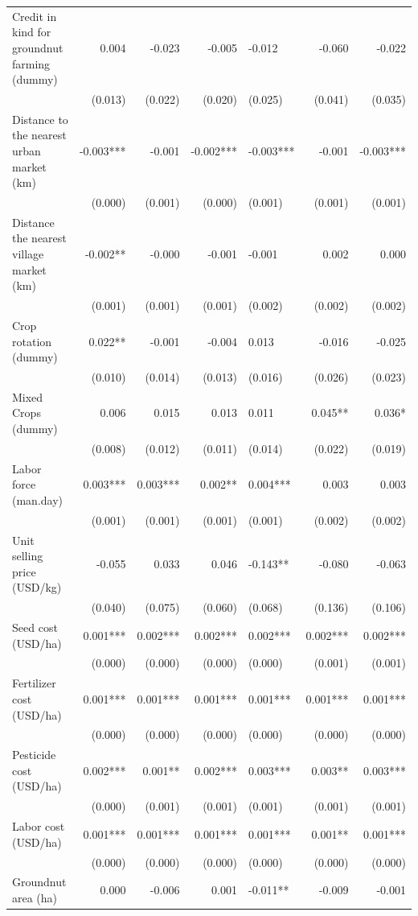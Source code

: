 \documentclass[
]{article}
\begin{document}
\begin{landscape}
\begin{longtable}[t]{lrrrlrr}
Credit in kind for groundnut farming (dummy) & 0.004 & -0.023 & -0.005 & -0.012 & -0.060 & -0.022\\
 & (0.013) & (0.022) & (0.020) & (0.025) & (0.041) & (0.035)\\
Distance to the nearest urban market (km) & -0.003*** & -0.001 & -0.002*** & -0.003*** & -0.001 & -0.003***\\
 & (0.000) & (0.001) & (0.000) & (0.001) & (0.001) & (0.001)\\
Distance the nearest village market (km) & -0.002** & -0.000 & -0.001 & -0.001 & 0.002 & 0.000\\
 & (0.001) & (0.001) & (0.001) & (0.002) & (0.002) & (0.002)\\
Crop rotation (dummy) & 0.022** & -0.001 & -0.004 & 0.013 & -0.016 & -0.025\\
 & (0.010) & (0.014) & (0.013) & (0.016) & (0.026) & (0.023)\\
Mixed Crops (dummy) & 0.006 & 0.015 & 0.013 & 0.011 & 0.045** & 0.036*\\
 & (0.008) & (0.012) & (0.011) & (0.014) & (0.022) & (0.019)\\
Labor force (man.day) & 0.003*** & 0.003*** & 0.002** & 0.004*** & 0.003 & 0.003\\
 & (0.001) & (0.001) & (0.001) & (0.001) & (0.002) & (0.002)\\
Unit selling price (USD/kg) & -0.055 & 0.033 & 0.046 & -0.143** & -0.080 & -0.063\\
 & (0.040) & (0.075) & (0.060) & (0.068) & (0.136) & (0.106)\\
Seed cost (USD/ha) & 0.001*** & 0.002*** & 0.002*** & 0.002*** & 0.002*** & 0.002***\\
 & (0.000) & (0.000) & (0.000) & (0.000) & (0.001) & (0.001)\\
Fertilizer cost (USD/ha) & 0.001*** & 0.001*** & 0.001*** & 0.001*** & 0.001*** & 0.001***\\
 & (0.000) & (0.000) & (0.000) & (0.000) & (0.000) & (0.000)\\
Pesticide cost (USD/ha) & 0.002*** & 0.001** & 0.002*** & 0.003*** & 0.003** & 0.003***\\
 & (0.000) & (0.001) & (0.001) & (0.001) & (0.001) & (0.001)\\
Labor cost (USD/ha) & 0.001*** & 0.001*** & 0.001*** & 0.001*** & 0.001** & 0.001***\\
 & (0.000) & (0.000) & (0.000) & (0.000) & (0.000) & (0.000)\\
Groundnut area (ha) & 0.000 & -0.006 & 0.001 & -0.011** & -0.009 & -0.001\\

\end{longtable}
\end{landscape}
\end{document}
